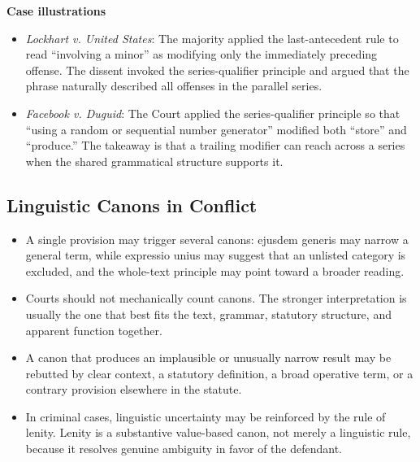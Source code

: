 \documentclass[11pt]{tex/lawoutline}
\begin{document}
\textbf{Case illustrations}

\begin{itemize}
    \item \textit{Lockhart v. United States}: The majority applied the last-antecedent rule to read ``involving a minor'' as modifying only the immediately preceding offense. The dissent invoked the series-qualifier principle and argued that the phrase naturally described all offenses in the parallel series.
    \item \textit{Facebook v. Duguid}: The Court applied the series-qualifier principle so that ``using a random or sequential number generator'' modified both ``store'' and ``produce.'' The takeaway is that a trailing modifier can reach across a series when the shared grammatical structure supports it.
\end{itemize}

\subsection{Linguistic Canons in Conflict}

\begin{itemize}
    \item A single provision may trigger several canons: ejusdem generis may narrow a general term, while expressio unius may suggest that an unlisted category is excluded, and the whole-text principle may point toward a broader reading.
    \item Courts should not mechanically count canons. The stronger interpretation is usually the one that best fits the text, grammar, statutory structure, and apparent function together.
    \item A canon that produces an implausible or unusually narrow result may be rebutted by clear context, a statutory definition, a broad operative term, or a contrary provision elsewhere in the statute.
    \item In criminal cases, linguistic uncertainty may be reinforced by the rule of lenity. Lenity is a substantive value-based canon, not merely a linguistic rule, because it resolves genuine ambiguity in favor of the defendant.
\end{itemize}
\end{document}
